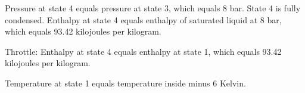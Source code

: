 Pressure at state 4 equals pressure at state 3, which equals 8 bar.  
State 4 is fully condensed.  
Enthalpy at state 4 equals enthalpy of saturated liquid at 8 bar, which equals 93.42 kilojoules per kilogram.  

Throttle:  
Enthalpy at state 4 equals enthalpy at state 1, which equals 93.42 kilojoules per kilogram.  

Temperature at state 1 equals temperature inside minus 6 Kelvin.